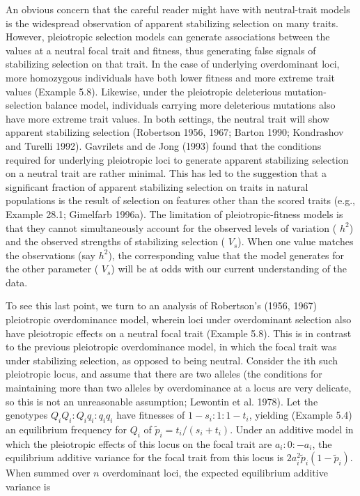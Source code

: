 \documentclass{article}
\begin{document}
An obvious concern that the careful reader might have with neutral-trait models is the widespread observation of apparent stabilizing selection on many traits. However, pleiotropic selection models can generate associations between the values at a neutral focal trait and fitness, thus generating false signals of stabilizing selection on that trait. In the case of underlying overdominant loci, more homozygous individuals have both lower fitness and more extreme trait values (Example 5.8). Likewise, under the pleiotropic deleterious mutation-selection balance model, individuals carrying more deleterious mutations also have more extreme trait values. In both settings, the neutral trait will show apparent stabilizing selection (Robertson 1956, 1967; Barton 1990; Kondrashov and Turelli 1992). Gavrilets and de Jong (1993) found that the conditions required for underlying pleiotropic loci to generate apparent stabilizing selection on a neutral trait are rather minimal. This has led to the suggestion that a significant fraction of apparent stabilizing selection on traits in natural populations is the result of selection on features other than the scored traits (e.g., Example 28.1; Gimelfarb 1996a). The limitation of pleiotropic-fitness models is that they cannot simultaneously account for the observed levels of variation ( $ h^{2} $) and the observed strengths of stabilizing selection ( $ V_{s} $). When one value matches the observations (say  $ h^{2} $), the corresponding value that the model generates for the other parameter ( $ V_{s} $) will be at odds with our current understanding of the data.

To see this last point, we turn to an analysis of Robertson’s (1956, 1967) pleiotropic overdominance model, wherein loci under overdominant selection also have pleiotropic effects on a neutral focal trait (Example 5.8). This is in contrast to the previous pleiotropic overdominance model, in which the focal trait was under stabilizing selection, as opposed to being neutral. Consider the ith such pleiotropic locus, and assume that there are two alleles (the conditions for maintaining more than two alleles by overdominance at a locus are very delicate, so this is not an unreasonable assumption; Lewontin et al. 1978). Let the genotypes  $ Q_i Q_i : Q_i q_i : q_i q_i $ have fitnesses of  $ 1 - s_i : 1 : 1 - t_i $, yielding (Example 5.4) an equilibrium frequency for  $ Q_i $ of  $ \widetilde{p}_i = t_i / (s_i + t_i) $. Under an additive model in which the pleiotropic effects of this locus on the focal trait are  $ a_i : 0 : -a_i $, the equilibrium additive variance for the focal trait from this locus is  $ 2a_i^2 \widetilde{p}_i (1 - \widetilde{p}_i) $. When summed over  $ n $ overdominant loci, the expected equilibrium additive variance is
\end{document}
